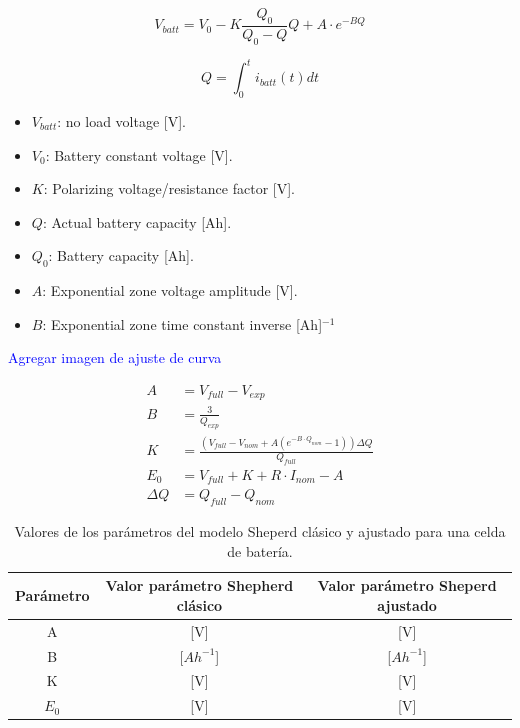 \begin{equation}
    V_{batt} = V_0 -K\frac{Q_0}{Q_0-Q}Q + A\cdot e^{-BQ}
\label{eq:Voc}
\end{equation}

\begin{equation}
    Q = \int_0^t i_{batt}(t)dt
\end{equation}

\begin{itemize}
    \item $V_{batt}$: no load voltage [V].
    \item $V_{0}$: Battery constant voltage [V].
    \item $K$: Polarizing voltage/resistance factor [V].
    \item $Q$: Actual battery capacity [Ah].
    \item $Q_{0}$: Battery capacity [Ah].
    \item $A$: Exponential zone voltage amplitude [V].
    \item $B$: Exponential zone time constant inverse [Ah]${}^{-1}$
\end{itemize}

\textcolor{blue}{Agregar imagen de ajuste de curva}

\begin{equation}
\begin{split}
    A &= V_{full}-V_{exp}\\
    B &= \frac{3}{Q_{exp}}\\
    K &= \frac{(V_{full}-V_{nom}+A (e^{-B\cdot Q_{nom}}-1)) \Delta Q}{Q_{full}}\\
    E_0 &= V_{full} + K + R\cdot I_{nom} - A\\
    \Delta Q &=Q_{full}-Q_{nom}
\end{split}
\label{ecuaciones}
\end{equation}



\begin{table}[h]
\centering
\caption{Valores de los parámetros del modelo Sheperd clásico y ajustado para una celda de batería.}
\label{table3}
\begin{tabular}{c|c|c}\hline
Parámetro& Valor parámetro Shepherd clásico & Valor parámetro Sheperd ajustado\\ \hline \hline 
A& [V]& [V]\\
B & [$Ah^{-1}$] & [$Ah^{-1}$]\\
K & [V]& [V]\\
$E_0$ & [V]& [V]\\
\hline \hline
\end{tabular}
\end{table}


